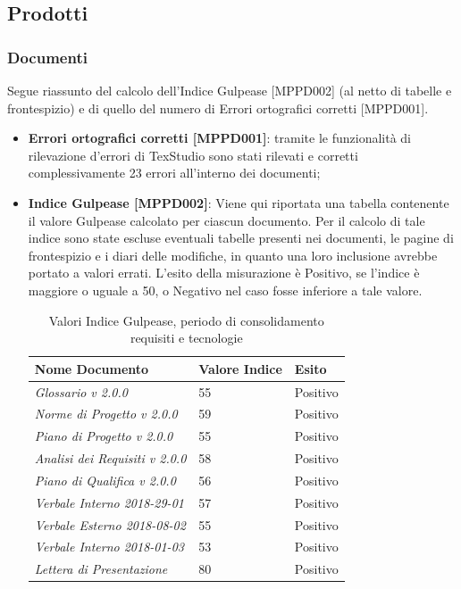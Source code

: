\documentclass[openany,12pt,a4paper]{report}
\begin{document}
\subsection{Prodotti}

\subsubsection{Documenti}

Segue riassunto del calcolo dell'Indice Gulpease [MPPD002] (al netto di tabelle e frontespizio) e di quello del numero di Errori ortografici corretti [MPPD001].

\begin{itemize}
	\item \textbf{Errori ortografici corretti [MPPD001]}: tramite le funzionalità di rilevazione d'errori di TexStudio sono stati rilevati e corretti complessivamente 23 errori all'interno dei documenti;
	
	\item \textbf{Indice Gulpease [MPPD002]}: Viene qui riportata una tabella contenente il valore Gulpease calcolato per ciascun documento.
	Per il calcolo di tale indice sono state escluse eventuali tabelle presenti nei documenti, le pagine di frontespizio e i diari delle modifiche, in quanto una loro inclusione avrebbe portato a valori errati. L'esito della misurazione è Positivo, se l'indice è maggiore o uguale a 50, o Negativo nel caso fosse inferiore a tale valore.
	
	\begin{table}[h]
		\begin{center}
			\setlength\LTleft{6mm}
			\begin{longtable}{|p{60mm}|p{30mm}|p{25mm}|}
				\hline  
				\textbf{Nome Documento} & \textbf{Valore Indice} & \textbf{Esito} \\ \hline    
				\textit{Glossario v 2.0.0} & 55 & Positivo\\ \hline    
				\textit{Norme di Progetto v 2.0.0} & 59 & Positivo\\ \hline    
				\textit{Piano di Progetto v 2.0.0} & 55 & Positivo\\ \hline    
				\textit{Analisi dei Requisiti v 2.0.0} & 58 & Positivo\\ \hline    
				\textit{Piano di Qualifica v 2.0.0} & 56 & Positivo\\ \hline    
				\textit{Verbale Interno 2018-29-01} & 57 & Positivo\\ \hline
				\textit{Verbale Esterno 2018-08-02} & 55 & Positivo\\ \hline
				\textit{Verbale Interno 2018-01-03} & 53 & Positivo\\ \hline    
				\textit{Lettera di Presentazione} & 80 & Positivo\\ \hline
			\end{longtable}
		\end{center}
		\caption{Valori Indice Gulpease, periodo di consolidamento requisiti e tecnologie} 
	\end{table} 
	

\end{itemize}
\end{document}
